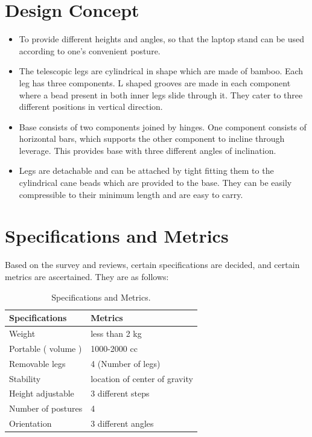 \section{Design Concept}

\begin{itemize}
\item To provide different heights and angles, so that the laptop stand can be used according to one’s convenient posture. 

\item The telescopic legs are cylindrical in shape which are made of bamboo. Each leg has three components. L shaped grooves are made in each component where a bead present in both inner legs slide through it. They cater to three different positions in vertical direction.

\item Base consists of two components joined by hinges. One component consists of horizontal bars, which supports the other component to incline through leverage. This provides base with three different angles of inclination.

\item Legs are detachable and can be attached by tight fitting them to the cylindrical cane beads which are provided to the base. They can be easily compressible to their minimum length and are easy to carry.

\end{itemize}

\section{Specifications and Metrics}

Based on the survey and reviews, certain specifications are decided, and certain metrics are ascertained. They are as follows:

\begin{table}[h!]
  \centering
  \caption{Specifications and Metrics.}
  \label{tab:table1}
  \begin{tabular}{l||l}
  	\hline
  	Specifications & Metrics\\
    \hline
	Weight & less than 2 kg\\
	Portable ( volume ) &1000-2000 cc\\
	Removable legs & 4 (Number of legs)\\
	Stability & location of center of gravity\\
	Height adjustable & 3 different steps\\
	Number of postures & 4\\
	Orientation & 3 different angles\\

  \end{tabular}
\end{table}

